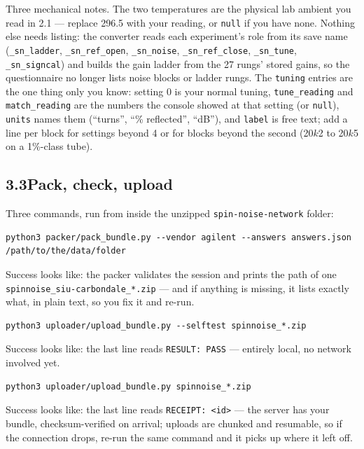\documentclass[11pt]{article}
\newcommand{\file}[1]{\texttt{#1}}
\begin{document}
Three mechanical notes. The two temperatures are the physical lab
ambient you read in 2.1 --- replace 296.5 with your reading, or
\texttt{null} if you have none. Nothing else needs listing: the
converter reads each experiment's role from its save name
(\texttt{\_sn\_ladder}, \texttt{\_sn\_ref\_open}, \texttt{\_sn\_noise},
\texttt{\_sn\_ref\_close}, \texttt{\_sn\_tune}, \texttt{\_sn\_signcal})
and builds the gain ladder from the 27 rungs' stored gains, so the
questionnaire no longer lists noise blocks or ladder rungs. The
\texttt{tuning} entries are the one thing only you know: setting 0 is
your normal tuning, \texttt{tune\_reading} and \texttt{match\_reading}
are the numbers the console showed at that setting (or \texttt{null}),
\texttt{units} names them (``turns'', ``\% reflected'', ``dB''), and
\texttt{label} is free text; add a line per block for settings beyond
4 or for blocks beyond the second (20$k$2 to 20$k$5 on a 1\%-class
tube).

\subsection*{3.3\quad Pack, check, upload}

Three commands, run from inside the unzipped
\file{spin-noise-network} folder:

\begin{lstlisting}
python3 packer/pack_bundle.py --vendor agilent --answers answers.json /path/to/the/data/folder
\end{lstlisting}
Success looks like: the packer validates the session and prints the
path of one \file{spinnoise\_siu-\allowbreak carbondale\_*.zip} ---
and if anything is missing, it lists exactly what, in plain text, so
you fix it and re-run.

\begin{lstlisting}
python3 uploader/upload_bundle.py --selftest spinnoise_*.zip
\end{lstlisting}
Success looks like: the last line reads \texttt{RESULT: PASS} ---
entirely local, no network involved yet.

\begin{lstlisting}
python3 uploader/upload_bundle.py spinnoise_*.zip
\end{lstlisting}
Success looks like: the last line reads \texttt{RECEIPT: <id>} ---
the server has your bundle, checksum-verified on arrival; uploads are
chunked and resumable, so if the connection drops, re-run the same
command and it picks up where it left off.
\end{document}

